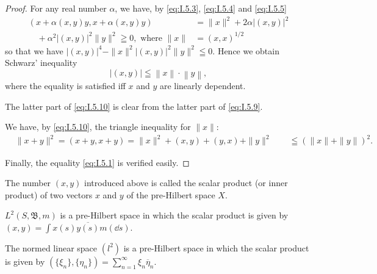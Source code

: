 \begin{proof}
 For any real number $\alpha$, we have, by \eqref{eq:I.5.3}, \eqref{eq:I.5.4} and \eqref{eq:I.5.5} 
\[
\begin{aligned}
(x + \alpha (x, y) y, x + \alpha (x, y) y) &= \| x \| ^{2} + 2 \alpha | (x, y) | ^{2}
\\
\quad + \alpha^{2} | (x, y) | ^{2} \| y \| ^{2} \geqq 0, \text{ where } \| x \| &= (x, x) ^{1/2}
\end{aligned}
\]
so that we have $|(x, y)|^4- \|x\|^2 |(x, y)|^2 \|y\|^2 \leqq 0$. Hence we obtain Schwarz' inequality 
\begin{equation}\label{eq:I.5.10}
\left| (x, y) \right| \leqq \left\| x \right\| \cdot \left\| y \right\|,
\end{equation}
where the equality is satisfied iff $x$ and $y$ are linearly dependent. 

The latter part of \eqref{eq:I.5.10} is clear from the latter part of \eqref{eq:I.5.9}. 

We have, by \eqref{eq:I.5.10}, the triangle inequality for $\|x\|$: 
\[
\begin{aligned}
&{\| x + y \| ^{2} = (x + y, x + y) = \| x \| ^{2} + (x, y) + (y, x) + \| y \| ^{2}} {\qquad \leqq (\| x \| + \| y \|) ^{2}.}
\end{aligned}
\]

Finally, the equality \eqref{eq:I.5.1} is verified easily. 
\end{proof}

\begin{definition}\label{def:I.5.Definition.2} The number $(x, y)$ introduced above is called the scalar product (or inner product) of two vectors $x$ and $y$ of the pre-Hilbert space $X$. 
\end{definition}

\begin{example}\label{ex:I.5.Example.1} $L^2(S, \mathfrak{B}, m)$ is a pre-Hilbert space in which the scalar product is given by $(x, y) = \int x(s) \overline{y(s)} m(\dd s)$. 
\end{example}

\begin{example}\label{ex:I.5.Example.2} The normed linear space $(l^2)$ is a pre-Hilbert space in which the scalar product is given by $(\{\xi_n\}, \{\eta_n\}) = \sum\limits_{n=1}^{\infty} \xi_n \overline{\eta}_n$. 
\end{example}


